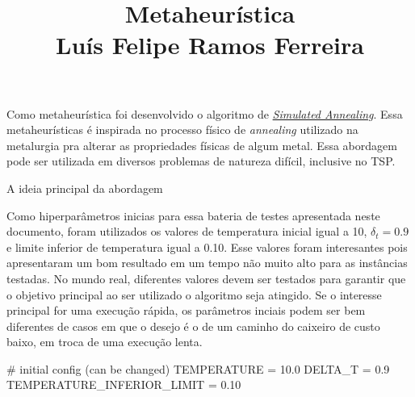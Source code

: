\documentclass{article}
\title{\vspace{-3em} Metaheurística \\ Luís Felipe Ramos Ferreira \vspace{-3em}}
\date{}
\begin{document}
\maketitle

Como metaheurística foi desenvolvido o algoritmo de \href{https://en.wikipedia.org/wiki/Simulated_annealing}{\textit{Simulated Annealing}}. Essa metaheurísticas é inspirada
no processo físico de \textit{annealing} utilizado na metalurgia pra alterar as propriedades físicas de algum metal. Essa abordagem pode ser utilizada em diversos problemas de natureza difícil,
inclusive no TSP.

A ideia principal da abordagem

Como hiperparâmetros inicias para essa bateria de testes apresentada neste documento, foram utilizados os valores de temperatura inicial igual a 10, \(\delta_t = 0.9\) e limite inferior de temperatura igual a 0.10. Esse valores foram interesantes
pois apresentaram um bom resultado em um tempo não muito alto para as instâncias testadas. No mundo real, diferentes valores devem ser testados para garantir que o objetivo principal ao ser utilizado o algoritmo seja atingido.
Se o interesse principal for uma execução rápida, os parâmetros inciais podem ser bem diferentes de casos em que o desejo é o de um caminho do caixeiro de custo baixo, em troca de uma execução lenta.

# initial config (can be changed)
TEMPERATURE = 10.0
DELTA_T = 0.9
TEMPERATURE_INFERIOR_LIMIT = 0.10
\end{document}
